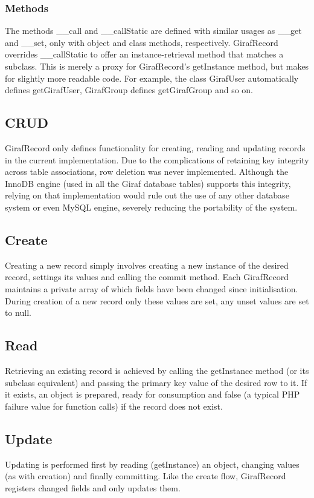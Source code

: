 \subsubsection*{Methods}
The methods __call and __callStatic are defined with similar usages as __get and __set, only with object and class methods, respectively. GirafRecord overrides __callStatic to offer an instance-retrieval method that matches a subclass. This is merely a proxy for GirafRecord's getInstance method, but makes for slightly more readable code. For example, the class GirafUser automatically defines getGirafUser, GirafGroup defines getGirafGroup and so on.

\subsection{CRUD}
GirafRecord only defines functionality for creating, reading and updating records in the current implementation. Due to the complications of retaining key integrity across table associations, row deletion was never implemented. Although the InnoDB engine (used in all the Giraf database tables) supports this integrity, relying on that implementation would rule out the use of any other database system or even MySQL engine, severely reducing the portability of the system.

\subsection*{Create}
Creating a new record simply involves creating a new instance of the desired record, settings its values and calling the commit method. Each GirafRecord maintains a private array of which fields have been changed since initialisation. During creation of a new record only these values are set, any unset values are set to null.

\subsection*{Read}
Retrieving an existing record is achieved by calling the getInstance method (or its subclass equivalent) and passing the primary key value of the desired row to it. If it exists, an object is prepared, ready for consumption and false (a typical PHP failure value for function calls) if the record does not exist.

\subsection*{Update}
Updating is performed first by reading (getInstance) an object, changing values (as with creation) and finally committing. Like the create flow, GirafRecord registers changed fields and only updates them.

